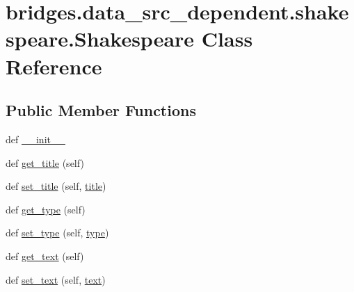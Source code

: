 \hypertarget{classbridges_1_1data__src__dependent_1_1shakespeare_1_1_shakespeare}{}\section{bridges.\+data\+\_\+src\+\_\+dependent.\+shakespeare.\+Shakespeare Class Reference}
\label{classbridges_1_1data__src__dependent_1_1shakespeare_1_1_shakespeare}
\subsection*{Public Member Functions}
\begin{DoxyCompactItemize}
\item 
def \mbox{\hyperlink{classbridges_1_1data__src__dependent_1_1shakespeare_1_1_shakespeare_a22b3c0d1bcce2f1c7f7845b9db8a8610}{\+\_\+\+\_\+init\+\_\+\+\_\+}}
\item 
def \mbox{\hyperlink{classbridges_1_1data__src__dependent_1_1shakespeare_1_1_shakespeare_a90eb741c813407e4743e65d7038200e3}{get\+\_\+title}} (self)
\item 
def \mbox{\hyperlink{classbridges_1_1data__src__dependent_1_1shakespeare_1_1_shakespeare_a5fdace49d7eeb72a4b136171fed737d7}{set\+\_\+title}} (self, \mbox{\hyperlink{classbridges_1_1data__src__dependent_1_1shakespeare_1_1_shakespeare_a1827d750baf850a026773141759b0825}{title}})
\item 
def \mbox{\hyperlink{classbridges_1_1data__src__dependent_1_1shakespeare_1_1_shakespeare_acb1601117b977d699168db573dcbfcac}{get\+\_\+type}} (self)
\item 
def \mbox{\hyperlink{classbridges_1_1data__src__dependent_1_1shakespeare_1_1_shakespeare_a37b424d83615c9dc3206fcd1e8045a27}{set\+\_\+type}} (self, \mbox{\hyperlink{classbridges_1_1data__src__dependent_1_1shakespeare_1_1_shakespeare_acb403ed7119a3b28cacd5672ebc4c6a2}{type}})
\item 
def \mbox{\hyperlink{classbridges_1_1data__src__dependent_1_1shakespeare_1_1_shakespeare_a393a9451260497aaf442474067ad353d}{get\+\_\+text}} (self)
\item 
def \mbox{\hyperlink{classbridges_1_1data__src__dependent_1_1shakespeare_1_1_shakespeare_aaffe5df49d69da3a97bfe7215ed8e0e6}{set\+\_\+text}} (self, \mbox{\hyperlink{classbridges_1_1data__src__dependent_1_1shakespeare_1_1_shakespeare_a90eee8bdd03e6b57b56b8ed9e12a22aa}{text}})
\end{DoxyCompactItemize}
